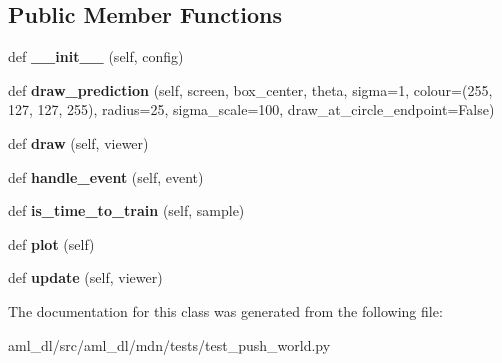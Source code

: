 \subsection*{Public Member Functions}
\begin{DoxyCompactItemize}
\item 
\hypertarget{classtest__push__world_1_1_test_model_push_world_a6c6696996185698142a2403dde4e3a3d}{}\label{classtest__push__world_1_1_test_model_push_world_a6c6696996185698142a2403dde4e3a3d} 
def {\bfseries \+\_\+\+\_\+init\+\_\+\+\_\+} (self, config)
\item 
\hypertarget{classtest__push__world_1_1_test_model_push_world_a7fb1d8d0e98b0c532d08ebce06045f79}{}\label{classtest__push__world_1_1_test_model_push_world_a7fb1d8d0e98b0c532d08ebce06045f79} 
def {\bfseries draw\+\_\+prediction} (self, screen, box\+\_\+center, theta, sigma=1, colour=(255, 127, 127, 255), radius=25, sigma\+\_\+scale=100, draw\+\_\+at\+\_\+circle\+\_\+endpoint=False)
\item 
\hypertarget{classtest__push__world_1_1_test_model_push_world_a6bcc5edcb1de05b15743b16752275639}{}\label{classtest__push__world_1_1_test_model_push_world_a6bcc5edcb1de05b15743b16752275639} 
def {\bfseries draw} (self, viewer)
\item 
\hypertarget{classtest__push__world_1_1_test_model_push_world_a65db35df098129ff009232f984f9c15c}{}\label{classtest__push__world_1_1_test_model_push_world_a65db35df098129ff009232f984f9c15c} 
def {\bfseries handle\+\_\+event} (self, event)
\item 
\hypertarget{classtest__push__world_1_1_test_model_push_world_a740050ccae06c845062db8fc2e6237b2}{}\label{classtest__push__world_1_1_test_model_push_world_a740050ccae06c845062db8fc2e6237b2} 
def {\bfseries is\+\_\+time\+\_\+to\+\_\+train} (self, sample)
\item 
\hypertarget{classtest__push__world_1_1_test_model_push_world_a8a26d0ebd427499fdc557520495734ab}{}\label{classtest__push__world_1_1_test_model_push_world_a8a26d0ebd427499fdc557520495734ab} 
def {\bfseries plot} (self)
\item 
\hypertarget{classtest__push__world_1_1_test_model_push_world_a6f3d6e1f020023ee48197a1a13704882}{}\label{classtest__push__world_1_1_test_model_push_world_a6f3d6e1f020023ee48197a1a13704882} 
def {\bfseries update} (self, viewer)
\end{DoxyCompactItemize}


The documentation for this class was generated from the following file\+:\begin{DoxyCompactItemize}
\item 
aml\+\_\+dl/src/aml\+\_\+dl/mdn/tests/test\+\_\+push\+\_\+world.\+py\end{DoxyCompactItemize}

